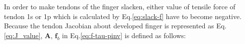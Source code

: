 \documentclass{llncs}
\begin{document}

			



	In order to make tendons of the finger slacken, either value of tensile force of tendon 1s or 1p which is calculated by Eq.\ref{eq:slack-f} have to become negative.
	Because the tendon Jacobian about developed finger is represented as Eq.\ref{eq:J_value}, 
	$\bm{A}$, $\bm{f}_b$ in Eq.\ref{eq:f-tau-pinv} is defined as follows:
\end{document}
